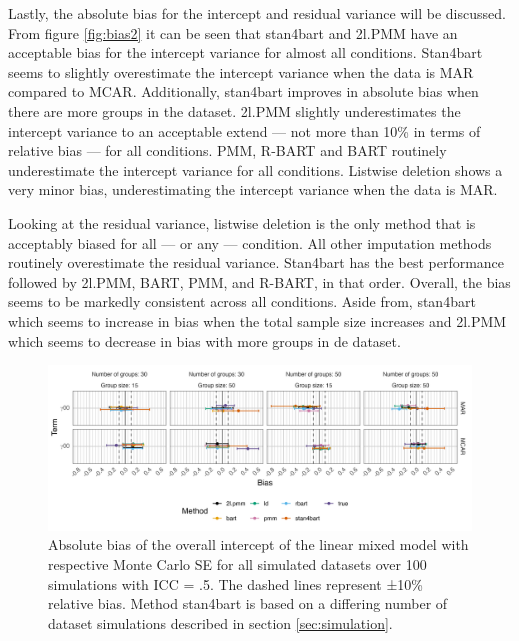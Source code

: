 \documentclass[3p,12pt,a4paper]{elsarticle}
\begin{document}

Lastly, the absolute bias for the intercept and residual variance will be discussed. From figure \ref{fig:bias2} it can be seen that stan4bart and 2l.PMM have an acceptable bias for the intercept variance for almost all conditions. Stan4bart seems to slightly overestimate the intercept variance when the data is MAR compared to MCAR. Additionally, stan4bart improves in absolute bias when there are more groups in the dataset. 2l.PMM slightly underestimates the intercept variance to an acceptable extend --- not more than 10\% in terms of relative bias --- for all conditions. PMM, R-BART and BART routinely underestimate the intercept variance for all conditions. Listwise deletion shows a very minor bias, underestimating the intercept variance when the data is MAR. 

Looking at the residual variance, listwise deletion is the only method that is acceptably biased for all --- or any --- condition. All other imputation methods routinely overestimate the residual variance. Stan4bart has the best performance followed by 2l.PMM, BART, PMM, and R-BART, in that order. Overall, the bias seems to be markedly consistent across all conditions. Aside from, stan4bart which seems to increase in bias when the total sample size increases and 2l.PMM which seems to decrease in bias with more groups in de dataset. 

\begin{figure}[H]
    \centering
    \includegraphics[width=1\textwidth]{biasintercept.png}
    \caption{Absolute bias of the overall intercept of the linear mixed model with respective Monte Carlo SE for all simulated datasets over 100 simulations with ICC = .5. The dashed lines represent ±10\% relative bias. Method stan4bart is based on a differing number of dataset simulations described in section \ref{sec:simulation}.}
    \label{fig:biasintercept}
\end{figure}
\end{document}

